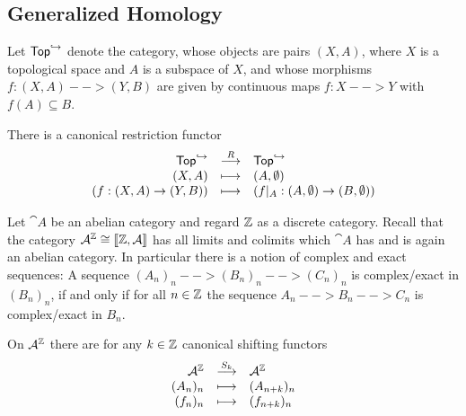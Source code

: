 \subsection{Generalized Homology}

\begin{definition}
	Let $\ncat{Top}^\rightincl$ denote the category, whose objects are pairs $(X,A)$, where $X$ is a topological space and $A$ is a subspace of $X$, and whose morphisms $f:(X,A) --> (Y,B)$ are given by continuous maps $f:X-->Y$ with $f(A) \subseteq B$.

	There is a canonical restriction functor
	\begin{equation*}
		\begin{array}{rcl}
			\ncat{Top}^\rightincl & \overset{R}{\longrightarrow} & \ncat{Top}^\rightincl\\
			(X,A) & \longmapsto & (A,\emptyset)\\
			(f:(X,A)\rightarrow(Y,B)) & \longmapsto & (f|_A:(A,\emptyset)\rightarrow(B,\emptyset))
		\end{array}
	\end{equation*}
\end{definition}


\begin{remark}
	Let $\cat{A}$ be an abelian category and regard $\mathbb{Z}$ as a discrete category. Recall that the category $\mathcal{A}^{\mathbb{Z}} \cong |[\mathbb{Z},\mathcal{A}|]$ has all limits and colimits which $\cat{A}$ has and is again an abelian category. In particular there is a notion of complex and exact sequences: A sequence $(A_n)_n --> (B_n)_n --> (C_n)_n$ is complex/exact in $(B_n)_n$, if and only if for all $n \in \mathbb{Z}$ the sequence $A_n --> B_n --> C_n$ is complex/exact in $B_n$.
	
	On $\mathcal{A}^{\mathbb{Z}}$ there are for any $k \in \mathbb{Z}$ canonical shifting functors
	\begin{equation*}
		\begin{array}{rcl}
			\mathcal{A}^{\mathbb{Z}} & \overset{S_{k}}{\longrightarrow} & \mathcal{A}^{\mathbb{Z}}\\
			(A_n)_n & \longmapsto & (A_{n+k})_n\\
			(f_n)_n & \longmapsto & (f_{n+k})_n
		\end{array}
	\end{equation*}
\end{remark}

